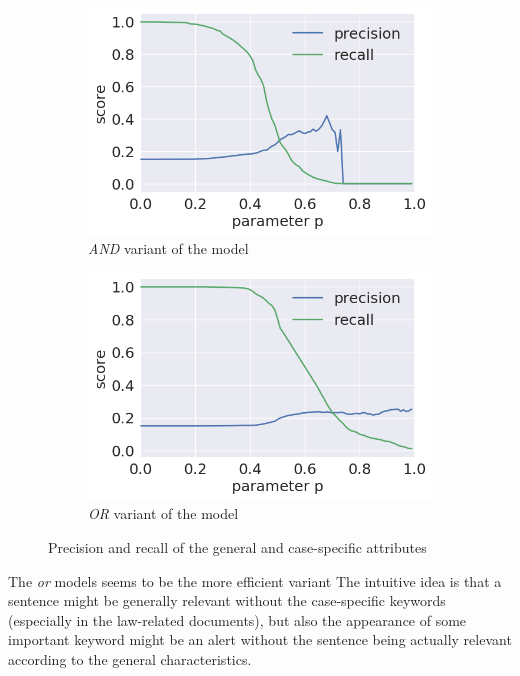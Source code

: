 \documentclass[
  digital, %
  notable,   %
  nolof,     %
  nolot,     %
]{fithesis3}
\begin{document}
\begin{figure}[h]
\begin{subfigure}{.5\textwidth}
  \centering
  \caption{\textit{AND} variant of the model}
  \label{fig:sent_andP}
  \includegraphics[width=\textwidth]{img/sent_andP}
\end{subfigure}%
\begin{subfigure}{.5\textwidth}
  \centering
  \caption{\textit{OR} variant of the model}
  \label{fig:sent_orP}
  \includegraphics[width=\textwidth]{img/sent_orP}
\end{subfigure}%
\caption{Precision and recall of the general and case-specific attributes}
\label{fig:sent_finalP}
\end{figure}

The \textit{or} models seems to be the more efficient variant
The intuitive idea is that a sentence might be generally relevant without the case-specific keywords (especially in the law-related documents), but also the appearance of some important keyword might be an alert without the sentence being actually relevant according to the general characteristics.
\end{document}
